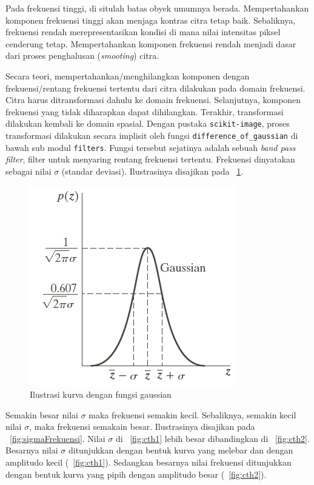 Pada frekuensi tinggi, di situlah batas obyek umumnya berada. Mempertahankan komponen frekuensi tinggi akan menjaga kontras citra tetap baik. Sebaliknya, frekuensi rendah merepresentasikan kondisi di mana nilai intensitas piksel cenderung tetap. Mempertahankan komponen frekuensi rendah menjadi dasar dari proses penghalusan (\textit{smooting}) citra.

Secara teori, mempertahankan/menghilangkan komponen dengan frekuensi/rentang frekuensi tertentu dari citra dilakukan pada domain frekuensi. Citra harus ditransformasi dahulu ke domain frekuensi. Selanjutnya, komponen frekuensi yang tidak diharapkan dapat dihilangkan. Terakhir, transformasi dilakukan kembali ke domain spasial. Dengan pustaka \texttt{scikit-image}, proses transformasi dilakukan secara implisit oleh fungsi \texttt{difference\_of\_gaussian} di bawah sub modul \texttt{filters}. Fungsi tersebut sejatinya adalah sebuah \textit{band pass filter}, filter untuk menyaring rentang frekuensi tertentu. Frekuensi dinyatakan sebagai nilai $\sigma$ (standar deviasi). Ilustrasinya disajikan pada \figurename~\ref{fig:gaussian}.

\begin{figure}
  \begin{center}
    \includegraphics[scale=.6]{pics/gaussian.png}
    \caption{Ilustrasi kurva dengan fungsi gaussian}
    \label{fig:gaussian}
  \end{center}
\end{figure}

Semakin besar nilai $\sigma$ maka frekuensi semakin kecil. Sebaliknya, semakin kecil nilai $\sigma$, maka frekuensi semakain besar. Ilustrasinya disajikan pada \figurename~\ref{fig:sigmaFrekuensi}. Nilai $\sigma$ di \figurename~\ref{fig:cth1} lebih besar dibandingkan di \figurename~\ref{fig:cth2}. Besarnya nilai $\sigma$ ditunjukkan dengan bentuk kurva yang melebar dan dengan amplitudo kecil (\figurename~\ref{fig:cth1}). Sedangkan besarnya nilai frekuensi ditunjukkan dengan bentuk kurva yang pipih dengan amplitudo besar (\figurename~\ref{fig:cth2}).

